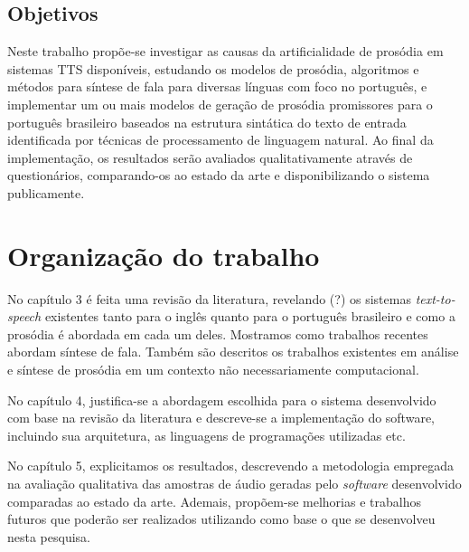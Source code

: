 \subsection{Objetivos}
Neste trabalho propõe-se investigar as causas da artificialidade de prosódia em sistemas TTS disponíveis, estudando os modelos de prosódia, algoritmos e métodos para síntese de fala para diversas línguas com foco no português, e implementar um ou mais modelos de geração de prosódia promissores para o português brasileiro baseados na estrutura sintática do texto de entrada identificada por técnicas de processamento de linguagem natural. Ao final da implementação, os resultados serão avaliados qualitativamente através de questionários, comparando-os ao estado da arte e disponibilizando o sistema publicamente.

\section{Organização do trabalho}


No capítulo 3 é feita uma revisão da literatura, revelando (?) os sistemas
\emph{text-to-speech} existentes tanto para o inglês quanto para o português
brasileiro e como a prosódia é abordada em cada um deles. Mostramos como
trabalhos recentes abordam síntese de fala. Também são descritos
os trabalhos existentes em análise e síntese de prosódia em um contexto não
necessariamente computacional.

No capítulo 4, justifica-se a abordagem escolhida para o sistema desenvolvido
com base na revisão da literatura e descreve-se a implementação do software,
incluindo sua arquitetura, as linguagens de programações utilizadas etc.

No capítulo 5, explicitamos os resultados, descrevendo a metodologia empregada
na avaliação qualitativa das amostras de áudio geradas pelo \emph{software}
desenvolvido comparadas ao estado da arte. Ademais, propõem-se melhorias e
trabalhos futuros que poderão ser realizados utilizando como base o que se
desenvolveu nesta pesquisa.